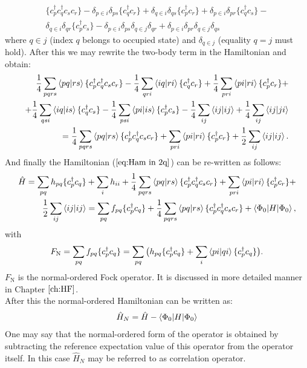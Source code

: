 \documentclass[twoside,english]{uiofysmaster}
\theoremstyle{definition}
\begin{document}
\begin{eqnarray}
 \{ c_p^\dagger c_q^\dagger c_s c_r  \} -\delta_{p \in i} \delta_{ps} \{  c_q^\dagger  c_r  \} +\delta_{q \in i} \delta_{qs}  \{  c_p^\dagger  c_r  \} + \delta_{p \in i} \delta_{pr} \{  c_q^\dagger  c_s  \}-\nonumber\\ \delta_{q \in i} \delta_{qr} \{  c_p^\dagger  c_s  \}-  \delta_{p \in i} \delta_{ps} \delta_{q \in j} \delta_{qr}+ \delta_{p \in i} \delta_{pr} \delta_{q \in j} \delta_{qs}
\end{eqnarray}
where $q \in j$ (index $q$ belongs to occupied state) and  $\delta_{q \in j}$ (equality $q=j$ must hold). After this we may rewrite the two-body term in the Hamiltonian and obtain:
\begin{eqnarray}
\frac{1}{4}\sum_{pqrs}\braket{pq|rs}\{ c_p^\dagger c_q^\dagger c_s c_r  \}-\frac{1}{4}\sum_{qri}\braket{iq|ri}\{ c_q^\dagger  c_r  \} +\frac{1}{4}\sum_{pri}\braket{pi|ri}\{ c_p^\dagger  c_r  \} + \nonumber\\ 
+\frac{1}{4}\sum_{qsi}\braket{iq|is}\{ c_q^\dagger  c_s  \} -\frac{1}{4}\sum_{psi}\braket{pi|is}\{ c_p^\dagger  c_s  \} -\frac{1}{4}\sum_{ij}\braket{ij|ij} + \frac{1}{4}\sum_{ij}\braket{ij|ji}  \nonumber\\ 
=\frac{1}{4}\sum_{pqrs}\braket{pq|rs}\{ c_p^\dagger c_q^\dagger c_s c_r  \} + \sum_{pri}\braket{pi|ri}\{ c_p^\dagger  c_r  \} + \frac{1}{2} \sum_{ij}\braket{ij|ij}.
\end{eqnarray}
And finally the Hamiltonian ($\ref{eq:Ham in 2q}$) can be re-written as follows:
\begin{eqnarray}
\hat{H} = \sum_{pq} h_{pq} \{c_p^\dagger c_q \} + \sum_{i}h_{ii} + \frac{1}{4}\sum_{pqrs}\braket{pq|rs}\{ c_p^\dagger c_q^\dagger c_s c_r  \} + \sum_{pri}\braket{pi|ri}\{ c_p^\dagger  c_r  \} + \nonumber\\ \frac{1}{2} \sum_{ij}\braket{ij|ij} 
=  \sum_{pq} f_{pq} \{c_p^\dagger c_q \} + \frac{1}{4}\sum_{pqrs}\braket{pq|rs}\{ c_p^\dagger c_q^\dagger c_s c_r  \} + \braket{\Phi_0|H|\Phi_0},
\end{eqnarray}
with
\begin{equation}\label{eq:Fock_operator}
F_\text{N} = \sum_{pq}f_{pq}\{c_p^\dagger c_q \}=\sum_{pq}\big(h_{pq}\{c_p^\dagger c_q \}+\sum_{i}\braket{pi|qi}\{c_p^\dagger c_q \}\big).
\end{equation}
$F_\text{N} $ is the normal-ordered Fock operator. It is discussed in more detailed manner in Chapter $\ref{ch:HF}$.\\
After this the normal-ordered Hamiltonian can be written as:
\begin{eqnarray}
\hat{H}_N = \hat{H} - \braket{\Phi_0|H|\Phi_0}
\end{eqnarray}
One may say that the normal-ordered form of the operator is obtained by subtracting the reference expectation value of this operator from the operator itself. In this case $\hat{H}_N$ may be referred to as correlation operator.
\end{document}
